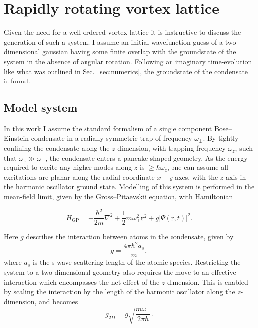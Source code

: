 \section{Rapidly rotating vortex lattice}
Given the need for a well ordered vortex lattice it is instructive to discuss the generation of such a system. I assume an initial wavefunction guess of a two-dimensional gaussian having some finite overlap with the groundstate of the system in the absence of angular rotation. Following an imaginary time-evolution like what was outlined in Sec.~\ref{sec:numerics}, the groundstate of the condensate is found.

\subsection{Model system}

In this work I assume the standard formalism of a single component Bose--Einstein condensate in a radially symmetric trap of frequency $\omega_\perp$. By tightly confining the condensate along the $z$-dimension, with trapping frequency $\omega_z$, such that $\omega_z \gg \omega_\perp$, the condensate enters a pancake-shaped geometry. As the energy required to excite any higher modes along $z$ is $\geq \hbar\omega_z$, one can assume all excitations are planar along the radial coordinate $x-y$ axes, with the $z$ axis in the harmonic oscillator ground state. Modelling of this system is performed in the mean-field limit, given by the Gross--Pitaevskii equation, with Hamiltonian

\begin{equation}\label{eqn:gpe_h0}
	H_{\mathrm{GP}} = -\frac{\hbar^2}{2m}\nabla^2 + \frac{1}{2}m\omega_{\perp}^2\mathbf{r}^2 + g\vert\Psi(\mathbf{r},t)\vert^2.
\end{equation}

Here $g$ describes the interaction between atoms in the condensate, given by \begin{equation}
g = \frac{4\pi\hbar^2a_s}{m},
\end{equation}
where $a_s$ is the s-wave scattering length of the atomic species. Restricting the system to a two-dimensional geometry also requires the move to an effective interaction which encompasses the net effect of the $z$-dimension. This is enabled by scaling the interaction by the length of the harmonic oscillator along the $z$-dimension, and becomes \cite[pg. 456]{BK:Pethick_smith_}
\begin{equation}
g_{2D} = g\sqrt{\frac{m\omega_\perp}{2\pi\hbar}}.
\end{equation}

